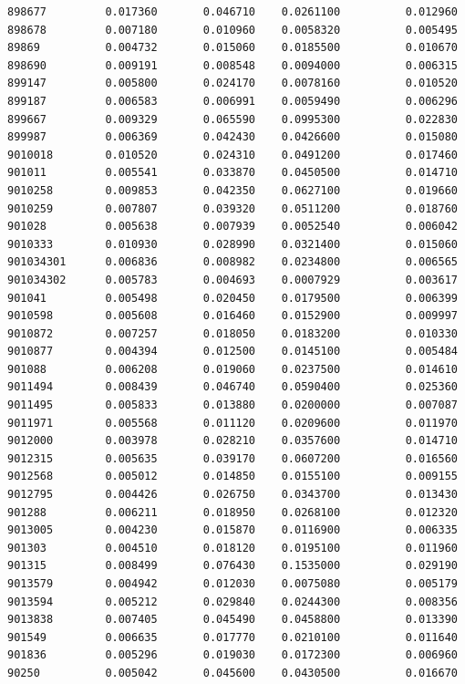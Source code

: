 \documentclass[
  letterpaper,
  DIV=11,
  numbers=noendperiod]{scrartcl}
\begin{document}
\begin{verbatim}
898677         0.017360       0.046710    0.0261100          0.012960
898678         0.007180       0.010960    0.0058320          0.005495
89869          0.004732       0.015060    0.0185500          0.010670
898690         0.009191       0.008548    0.0094000          0.006315
899147         0.005800       0.024170    0.0078160          0.010520
899187         0.006583       0.006991    0.0059490          0.006296
899667         0.009329       0.065590    0.0995300          0.022830
899987         0.006369       0.042430    0.0426600          0.015080
9010018        0.010520       0.024310    0.0491200          0.017460
901011         0.005541       0.033870    0.0450500          0.014710
9010258        0.009853       0.042350    0.0627100          0.019660
9010259        0.007807       0.039320    0.0511200          0.018760
901028         0.005638       0.007939    0.0052540          0.006042
9010333        0.010930       0.028990    0.0321400          0.015060
901034301      0.006836       0.008982    0.0234800          0.006565
901034302      0.005783       0.004693    0.0007929          0.003617
901041         0.005498       0.020450    0.0179500          0.006399
9010598        0.005608       0.016460    0.0152900          0.009997
9010872        0.007257       0.018050    0.0183200          0.010330
9010877        0.004394       0.012500    0.0145100          0.005484
901088         0.006208       0.019060    0.0237500          0.014610
9011494        0.008439       0.046740    0.0590400          0.025360
9011495        0.005833       0.013880    0.0200000          0.007087
9011971        0.005568       0.011120    0.0209600          0.011970
9012000        0.003978       0.028210    0.0357600          0.014710
9012315        0.005635       0.039170    0.0607200          0.016560
9012568        0.005012       0.014850    0.0155100          0.009155
9012795        0.004426       0.026750    0.0343700          0.013430
901288         0.006211       0.018950    0.0268100          0.012320
9013005        0.004230       0.015870    0.0116900          0.006335
901303         0.004510       0.018120    0.0195100          0.011960
901315         0.008499       0.076430    0.1535000          0.029190
9013579        0.004942       0.012030    0.0075080          0.005179
9013594        0.005212       0.029840    0.0244300          0.008356
9013838        0.007405       0.045490    0.0458800          0.013390
901549         0.006635       0.017770    0.0210100          0.011640
901836         0.005296       0.019030    0.0172300          0.006960
90250          0.005042       0.045600    0.0430500          0.016670

\end{verbatim}
\end{document}
